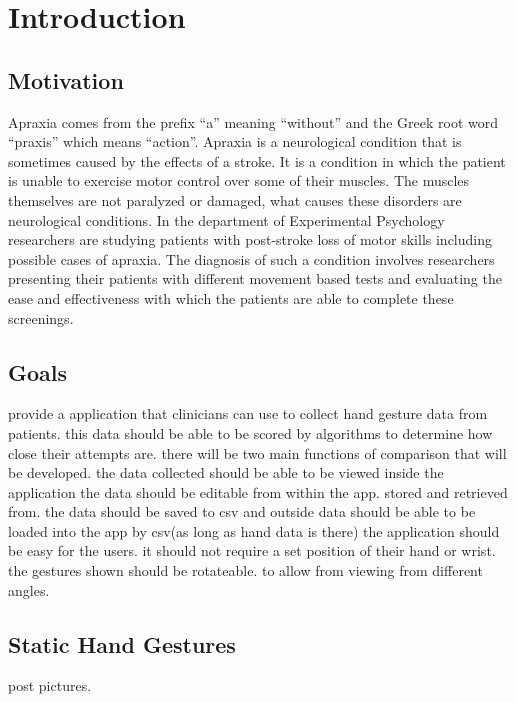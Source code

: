 \chapter{Introduction}

\label{Chapter1_introduction} 

\begin{comment}
-------------------------------------------------
1. Introduction
	a. Motivation
	b. Goals 
	c. Static Hand Gestures 
-------------------------------------------------
\end{comment}

\section{Motivation}
Apraxia comes from the prefix “a” meaning “without” and the  Greek root word “praxis” which means “action”. Apraxia is a neurological condition that is sometimes caused by the effects of a stroke. It is a condition in which the patient is unable to exercise motor control over some of their muscles. The muscles themselves are not paralyzed or damaged, what causes these disorders are neurological conditions. In the department of Experimental Psychology researchers are studying patients with post-stroke loss of motor skills including possible cases of apraxia. The diagnosis of such a condition involves researchers presenting their patients with different movement based tests and evaluating the ease and effectiveness with which the patients are able to complete these screenings.  
	
\section{Goals}

provide a application that clinicians can use to collect hand gesture data from patients. 
this data should be able to be scored by algorithms to determine how close their attempts are.
there will be two main functions of comparison that will be developed. 
the data collected should be able to be viewed inside the application
the data should be editable from within the app.
stored and retrieved from. 
the data should be saved to csv and outside data should be able to be loaded into the app by csv(as long as hand data is there)
the application should be easy for the users. it should not require a set position of their hand or wrist. 
the gestures shown should be rotateable. to allow from viewing from different angles. 





\section{Static Hand Gestures}
post pictures. 

